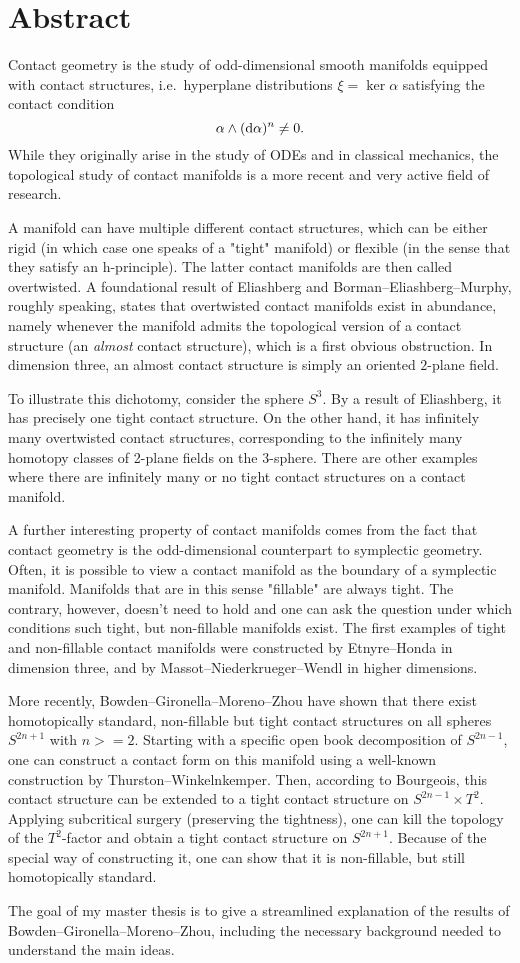 \section*{Abstract}
Contact geometry is the study of odd-dimensional smooth manifolds equipped with contact structures, i.e.\ hyperplane distributions $\xi = \ker \alpha$ satisfying the contact condition
\[
    \alpha \wedge (\mathrm{d} \alpha)^n \neq 0.
\]
While they originally arise in the study of ODEs and in classical mechanics, the topological study of contact manifolds is a more recent and very active field of research.

A manifold can have multiple different contact structures, which can be either rigid (in which case one speaks of a "tight" manifold) or flexible (in the sense that they satisfy an h-principle). The latter contact manifolds are then called overtwisted. A foundational result of Eliashberg and Borman--Eliashberg--Murphy, roughly speaking, states that overtwisted contact manifolds exist in abundance, namely whenever the manifold admits the topological version of a contact structure (an \emph{almost} contact structure), which is a first obvious obstruction. In dimension three, an almost contact structure is simply an oriented $2$-plane field. 


To illustrate this dichotomy, consider the sphere $S^3$. By a result of Eliashberg, it has precisely one tight contact structure. On the other hand, it has infinitely many overtwisted contact structures, corresponding to the infinitely many homotopy classes of 2-plane fields on the 3-sphere. There are other examples where there are infinitely many or no tight contact structures on a contact manifold.

A further interesting property of contact manifolds comes from the fact that contact geometry is the odd-dimensional counterpart to symplectic geometry. Often, it is possible to view a contact manifold as the boundary of a symplectic manifold. Manifolds that are in this sense "fillable" are always tight. The contrary, however, doesn't need to hold and one can ask the question under which conditions such tight, but non-fillable manifolds exist. The first examples of tight and non-fillable contact manifolds were constructed by Etnyre--Honda in dimension three, and by Massot--Niederkrueger--Wendl in higher dimensions.


More recently, Bowden--Gironella--Moreno--Zhou have shown that there exist homotopically standard, non-fillable but tight contact structures on all spheres $S^{2n+1}$ with $n >= 2$. Starting with a specific open book decomposition of $S^{2n-1}$, one can construct a contact form on this manifold using a well-known construction by Thurston--Winkelnkemper. Then, according to Bourgeois, this contact structure can be extended to a tight contact structure on $S^{2n-1}\times T^2$.
Applying subcritical surgery (preserving the tightness), one can kill the topology of the $T^2$-factor and obtain a tight contact structure on $S^{2n+1}$. Because of the special way of constructing it, one can show that it is non-fillable, but still homotopically standard.

The goal of my master thesis is to give a streamlined explanation of the results of Bowden--Gironella--Moreno--Zhou, including the necessary background needed to understand the main ideas.